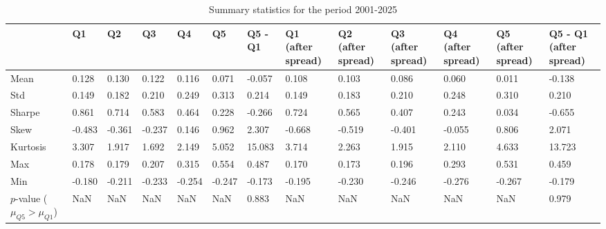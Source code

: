 \begin{table}
\caption{Summary statistics for the period 2001-2025}
\label{tab:summary_2001_2025}
\begin{tabular}{lllllllllllll}
\toprule
 & Q1 & Q2 & Q3 & Q4 & Q5 & Q5 - Q1 & Q1 (after spread) & Q2 (after spread) & Q3 (after spread) & Q4 (after spread) & Q5 (after spread) & Q5 - Q1 (after spread) \\
\midrule
Mean & 0.128 & 0.130 & 0.122 & 0.116 & 0.071 & -0.057 & 0.108 & 0.103 & 0.086 & 0.060 & 0.011 & -0.138 \\
Std & 0.149 & 0.182 & 0.210 & 0.249 & 0.313 & 0.214 & 0.149 & 0.183 & 0.210 & 0.248 & 0.310 & 0.210 \\
Sharpe & 0.861 & 0.714 & 0.583 & 0.464 & 0.228 & -0.266 & 0.724 & 0.565 & 0.407 & 0.243 & 0.034 & -0.655 \\
Skew & -0.483 & -0.361 & -0.237 & 0.146 & 0.962 & 2.307 & -0.668 & -0.519 & -0.401 & -0.055 & 0.806 & 2.071 \\
Kurtosis & 3.307 & 1.917 & 1.692 & 2.149 & 5.052 & 15.083 & 3.714 & 2.263 & 1.915 & 2.110 & 4.633 & 13.723 \\
Max & 0.178 & 0.179 & 0.207 & 0.315 & 0.554 & 0.487 & 0.170 & 0.173 & 0.196 & 0.293 & 0.531 & 0.459 \\
Min & -0.180 & -0.211 & -0.233 & -0.254 & -0.247 & -0.173 & -0.195 & -0.230 & -0.246 & -0.276 & -0.267 & -0.179 \\
$p$-value ($\mu_{Q5} > \mu_{Q1}$) & NaN & NaN & NaN & NaN & NaN & 0.883 & NaN & NaN & NaN & NaN & NaN & 0.979 \\
\bottomrule
\end{tabular}
\end{table}
